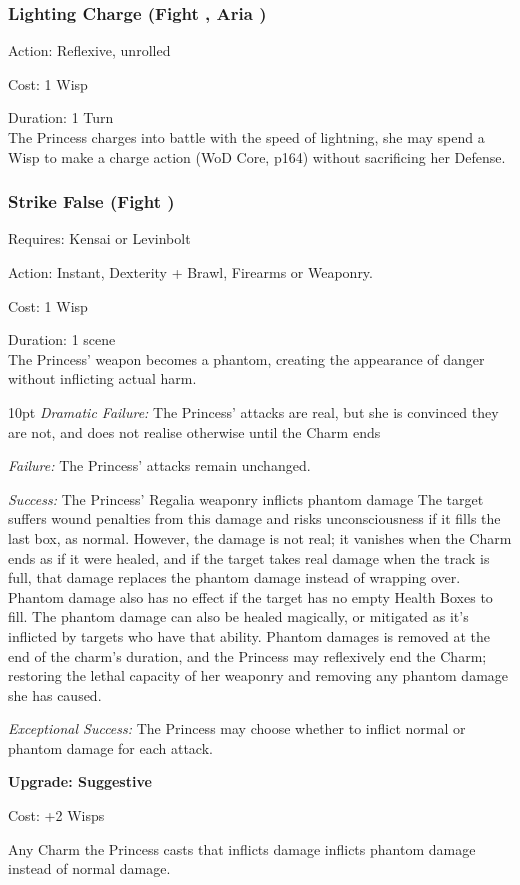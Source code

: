 \subsubsection*{Lighting Charge (Fight \textbullet, Aria \textbullet)}

\noindent Action: Reflexive, unrolled

\noindent Cost: 1 Wisp

\noindent Duration: 1 Turn\\

\noindent The Princess charges into battle with the speed of lightning, she may spend a Wisp to make a charge action (WoD Core, p164) without sacrificing her Defense.

\subsubsection*{Strike False (Fight \textbullet\textbullet)}

\noindent Requires: Kensai or Levinbolt

\noindent Action: Instant, Dexterity + Brawl, Firearms or Weaponry.

\noindent Cost: 1 Wisp

\noindent Duration: 1 scene \\

\noindent The Princess' weapon becomes a phantom, creating the appearance of danger without inflicting actual harm.

\begin{myindentpar}{10pt} 
\emph{Dramatic Failure:} The Princess' attacks are real, but she is convinced they are not, and does not realise otherwise until the Charm ends

\emph{Failure:} The Princess' attacks remain unchanged.

\emph{Success:} The Princess' Regalia weaponry inflicts phantom damage The target suffers wound penalties from this damage and risks unconsciousness if it fills the last box, as normal. However, the damage is not real; it vanishes when the Charm ends as if it were healed, and if the target takes real damage when the track is full, that damage replaces the phantom damage instead of wrapping over. Phantom damage also has no effect if the target has no empty Health Boxes to fill. The phantom damage can also be healed magically, or mitigated as it's inflicted by targets who have that ability. Phantom damages is removed at the end of the charm's duration, and the Princess may reflexively end the Charm; restoring the lethal capacity of her weaponry and removing any phantom damage she has caused. 

\emph{Exceptional Success:} The Princess may choose whether to inflict normal or phantom damage for each attack.

\textbf{Upgrade: Suggestive}

Cost: +2 Wisps

Any Charm the Princess casts that inflicts damage inflicts phantom damage instead of normal damage. 

\end{myindentpar}
